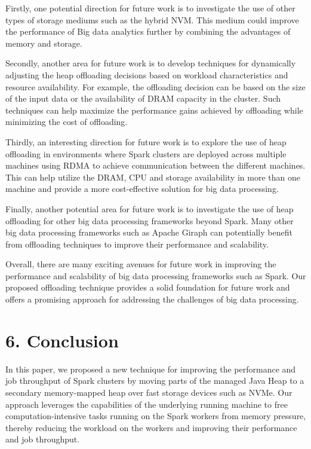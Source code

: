 \documentclass[twocolumn,10pt]{asme2e}
\begin{document}
Firstly, one potential direction for future work is to investigate the use of other types of storage mediums such as the hybrid NVM. This medium could improve the performance of Big data analytics further by combining the advantages of memory and storage.

Secondly, another area for future work is to develop techniques for dynamically adjusting the heap offloading decisions based on workload characteristics and resource availability. For example, the offloading decision can be based on the size of the input data or the availability of DRAM capacity in the cluster. Such techniques can help maximize the performance gains achieved by offloading while minimizing the cost of offloading.

Thirdly, an interesting direction for future work is to explore the use of heap offloading in environments where Spark clusters are deployed across multiple machines using RDMA to achieve communication between the different machines. This can help utilize the DRAM, CPU and storage availability in more than one machine and provide a more cost-effective solution for big data processing.

Finally, another potential area for future work is to investigate the use of heap offloading for other big data processing frameworks beyond Spark. Many other big data processing frameworks such as Apache Giraph can potentially benefit from offloading techniques to improve their performance and scalability.

Overall, there are many exciting avenues for future work in improving the performance and scalability of big data processing frameworks such as Spark. Our proposed offloading technique provides a solid foundation for future work and offers a promising approach for addressing the challenges of big data processing.

\section*{6. Conclusion}

In this paper, we proposed a new technique for improving the performance and job throughput of Spark clusters by moving parts of the managed Java Heap to a secondary memory-mapped heap over fast storage devices such as NVMe. Our approach leverages the capabilities of the underlying running machine to free computation-intensive tasks running on the Spark workers from memory pressure, thereby reducing the workload on the workers and improving their performance and job throughput.
\end{document}
